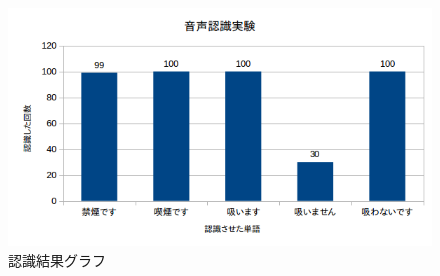 \documentclass[12pt,oneside]{sotsuken_paper}
\begin{document}
\begin{figure}[htbp]
\begin{center}
\includegraphics[width=150mm]{img/result.png}
\caption{認識結果グラフ}
\label{fig:result}
\end{center}
\end{figure}
\end{document}

